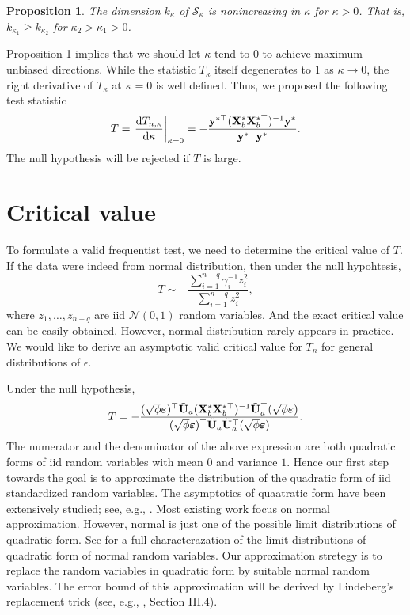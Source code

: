 \documentclass[11pt]{article}
\newcommand{\By}{\mathbf{y}}    \newcommand{\Bz}{\mathbf{z}}
\theoremstyle{plain}
\newtheorem{proposition}{\quad\quad Proposition}
\theoremstyle{definition}
\theoremstyle{remark}
\begin{document}
\begin{proposition}\label{prop:monotone}
    The dimension $k_{\kappa}$ of $\mathcal S_{\kappa}$ is nonincreasing in $\kappa$ for $\kappa>0$.
That is, $k_{\kappa_1} \geq k_{\kappa_2}$ for $ \kappa _2 > \kappa_1 > 0$.
\end{proposition}
Proposition \ref{prop:monotone} implies that we should let $\kappa$ tend to $0$ to achieve maximum unbiased directions.
While the statistic $ T_{\kappa}$ itself degenerates to $1$ as $\kappa\to 0$,
the right derivative of $T_{\kappa}$ at $\kappa=0$ is well defined.
Thus, we proposed the following test statistic
\begin{equation*}
    T=
    \left.\frac{\mathrm d T_{n,\kappa}}{\mathrm d \kappa}\right|_{\kappa=0}
    =
    -
     \frac{\By^{*\top} ( \BX_b^* \BX_b^{*\top} )^{-1} \By^* }{\By^{*\top} \By^*} .
\end{equation*}
The null hypothesis will be rejected if $T$ is large.




\section{Critical value}
To formulate a valid frequentist test, we need to determine the critical value of $T$.
If the data were indeed from normal distribution, then under the null hypohtesis,
\begin{equation*}
    T \sim
    -
    \frac{\sum_{i=1}^{n-q} \gamma_i^{-1} z_i^2}{\sum_{i=1}^{n-q} z_i^2},
    \end{equation*}
where $z_1,\ldots, z_{n-q}$ are iid $\mathcal N(0,1)$ random variables.
And the exact critical value can be easily obtained.
However, normal distribution rarely appears in practice.
We would like to derive an asymptotic valid critical value for $T_{n}$ for general distributions of $\epsilon$.

Under the null hypothesis,
\begin{equation*}
    T=-\frac{ (\sqrt \phi \boldsymbol{\varepsilon})^\top \tilde {\mathbf{U}}_a (\mathbf{X}_b^* \mathbf{X}_b^{*\top})^{-1} \tilde {\mathbf{U}}_a^\top (\sqrt \phi \boldsymbol{\varepsilon})}{ (\sqrt \phi \boldsymbol{\varepsilon})^\top \tilde {\mathbf{U}}_a  \tilde {\mathbf{U}}_a^\top (\sqrt \phi \boldsymbol{\varepsilon})}.
\end{equation*}
The numerator and the denominator of the above expression are both quadratic forms of iid random variables with mean $0$ and variance $1$.
Hence our first step towards the goal is to approximate the distribution of the quadratic form of iid standardized random variables.
The asymptotics of quaatratic form have been extensively studied; see, e.g., \cite{jiang1996reml,Bentkus1996Optimal,Goetze2002,Dicker2015Flexible,Bai2017}.
Most existing work focus on normal approximation.
However, normal is just one of the possible limit distributions of quadratic form.
See \cite{Sevast1961A} for a full characterazation of the limit distributions of quadratic form of normal random variables.
Our approximation stretegy is to replace the random variables in quadratic form by suitable normal random variables.
The error bound of this approximation will be derived by Lindeberg's replacement trick (see, e.g., \cite{pollard1984convergence}, Section III.4).
\end{document}
